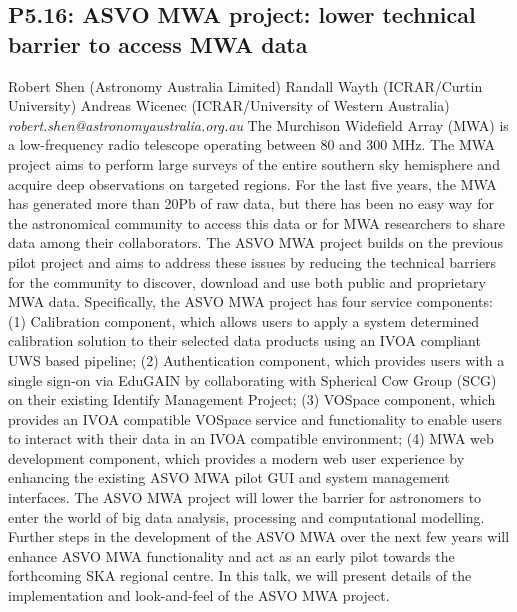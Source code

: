 \documentclass{report}
\begin{document}
\subsection*{P5.16: ASVO MWA project: lower technical barrier to access MWA data}
\bigskip
Robert Shen (Astronomy Australia Limited) \newline Randall Wayth (ICRAR/Curtin University) \newline  Andreas Wicenec (ICRAR/University of Western Australia)\newline   \newline  \newline  \newline\newline
{\it robert.shen@astronomyaustralia.org.au}\newline
\newline\newline
The Murchison Widefield Array (MWA) is a low-frequency radio telescope operating between 80 and 300 MHz. The MWA project aims to perform large surveys of the entire southern sky hemisphere and acquire deep observations on targeted regions. For the last five years, the MWA has generated more than 20Pb of raw data, but there has been no easy way for the astronomical community to access this data or for MWA researchers to share data among their collaborators. The ASVO MWA project builds on the previous pilot project and aims to address these issues by reducing the technical barriers for the community to discover, download and use both public and proprietary MWA data. Specifically, the ASVO MWA project has four service components: (1) Calibration component, which allows users to apply a system determined calibration solution to their selected  data products using an IVOA compliant UWS based pipeline; (2) Authentication component, which provides users with a single sign-on via EduGAIN by collaborating with Spherical Cow Group (SCG) on their existing Identify Management Project; (3) VOSpace component, which provides  an IVOA compatible VOSpace service and functionality to enable users to interact with their data in an IVOA compatible environment; (4) MWA web development component, which provides a modern web user experience by enhancing  the existing ASVO MWA pilot GUI and system management interfaces. 
The ASVO MWA project will lower the barrier for astronomers to enter the world of big data analysis, processing and computational modelling. Further steps in the development of the ASVO MWA over the next few years will enhance ASVO MWA functionality and act as an early pilot towards the forthcoming SKA regional centre. In this talk, we will present details of the implementation and look-and-feel of the ASVO MWA project.\newline
\newpage
\end{document}

